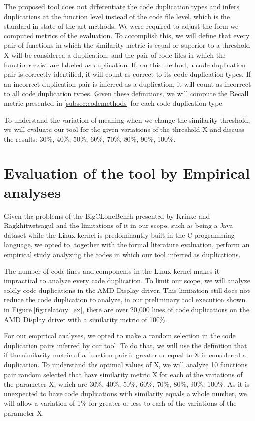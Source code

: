 The proposed tool does not differentiate the code duplication types and infers duplications 
at the function level instead of the code file level, which is the standard in state-of-the-art 
methods. We were required to adjust the form we computed metrics of the evaluation. To accomplish 
this, we will define that every pair of functions in which the similarity metric is equal or 
superior to a threshold X will be considered a duplication, and the pair of code files in which 
the functions exist are labeled as duplication. If, on this method, a code duplication pair is 
correctly identified, it will count as correct to its code duplication types. If an incorrect 
duplication pair is inferred as a duplication, it will count as incorrect to all code duplication 
types. Given these definitions, we will compute the Recall metric presented in \ref{subsec:codemethods}
for each code duplication type.

To understand the variation of meaning when we change the similarity threshold, we will evaluate 
our tool for the given variations of the threshold X and discuss the results: 
30\%, 40\%, 50\%, 60\%, 70\%, 80\%, 90\%, 100\%.

\section{Evaluation of the tool by Empirical analyses}

\label{sec:metemp}

Given the problems of the BigCLoneBench presented by Krinke and Ragkhitwetsagul \citep{bigfail}
and the limitations of it in our scope, such as being a Java dataset while the Linux kernel 
is predominantly built in the C programming language, we opted to, together with the formal 
literature evaluation, perform an empirical study analyzing the codes in which our tool inferred 
as duplications.

The number of code lines and components in the Linux kernel makes it impractical to analyze every 
code duplication. To limit our scope, we will analyze solely code duplications in the AMD Display 
driver. This limitation still does not reduce the code duplication to analyze, in our preliminary 
tool execution shown in Figure \ref{fig:relatory_ex}, there are over 20,000 lines of code 
duplications on the AMD Display driver with a similarity metric of 100\%.

For our empirical analyses, we opted to make a random selection in the code duplication pairs 
inferred by our tool. To do that, we will use the definition that if the similarity metric of a 
function pair is greater or equal to X is considered a duplication. To understand the optimal 
values of X, we will analyze 10 functions pair random selected that have similarity metric X 
for each of the variations of the parameter X, which are 
30\%, 40\%, 50\%, 60\%, 70\%, 80\%, 90\%, 100\%. 
As it is unexpected to have code duplications with similarity equals a whole number, we will 
allow a variation of 1\% for greater or less to each of the variations of the parameter X.

